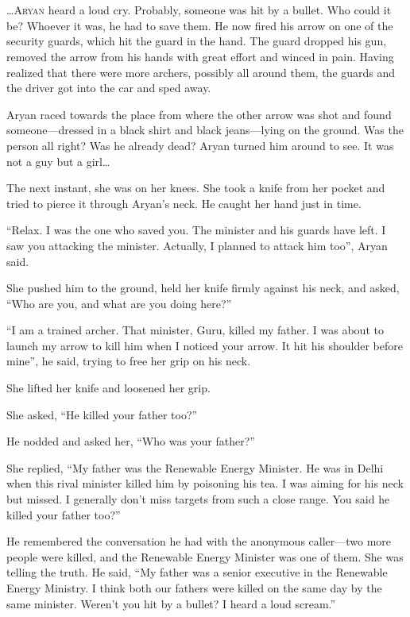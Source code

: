 \chapter{}

\lettrine{…}{Aryan} heard a loud cry. Probably, someone was hit by a bullet. Who could it
be? Whoever it was, he had to save them. He now fired his arrow on one of the
security guards, which hit the guard in the hand. The guard dropped his gun, removed
the arrow from his hands with great effort and winced in pain. Having realized
that there were more archers, possibly all around them, the guards and the
driver got into the car and sped away.

Aryan raced towards the place from where the other arrow was shot and found
someone—dressed in a black shirt and black jeans—lying on the ground. Was
the person all right? Was he already dead? Aryan turned him around to see. It
was not a guy but a girl…

The next instant, she was on her knees. She took a knife from her pocket and
tried to pierce it through Aryan's neck. He caught her hand just in time.

“Relax. I was the one who saved you. The minister and his guards have left. I
saw you attacking the minister. Actually, I planned to attack him too”, Aryan
said.

She pushed him to the ground, held her knife firmly against his neck, and asked,
“Who are you, and what are you doing here?”

“I am a trained archer. That minister, Guru, killed my father. I was about to
launch my arrow to kill him when I noticed your arrow. It hit his shoulder before
mine”, he said, trying to free her grip on his neck.

She lifted her knife and loosened her grip.

She asked, “He killed your father too?”

He nodded and asked her, “Who was your father?”

She replied, “My father was the Renewable Energy Minister. He was in
Delhi when this rival minister killed him by poisoning his tea. I was aiming for
his neck but missed. I generally don't miss targets from such a close range.
You said he killed your father too?”

He remembered the conversation he had with the anonymous caller—two more people
were killed, and the Renewable Energy
Minister was one of them. She was telling the truth. He said, “My father was a
senior executive in the Renewable Energy Ministry. I think both our fathers
were killed on the same day by the same minister. Weren't you hit by a bullet? I
heard a loud scream.”

